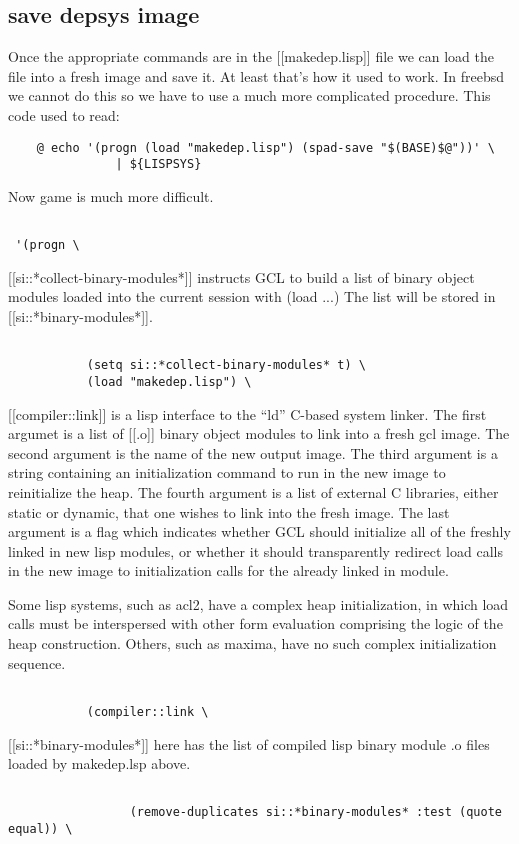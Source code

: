 \documentclass{article}
\begin{document}
\subsection{save depsys image}

Once the appropriate commands are in the [[makedep.lisp]] file
we can load the file into a fresh image and save it. At least that's
how it used to work. In freebsd we cannot do this so we have to use
a much more complicated procedure.
This code used to read:
\begin{verbatim}
	@ echo '(progn (load "makedep.lisp") (spad-save "$(BASE)$@"))' \
               | ${LISPSYS}
\end{verbatim}

Now game is much more difficult.
\begin{verbatim}

 '(progn \

\end{verbatim}

[[si::*collect-binary-modules*]] instructs GCL to build a list of
binary object modules loaded into the current session with (load ...)
The list will be stored in [[si::*binary-modules*]].
\begin{verbatim}

	       (setq si::*collect-binary-modules* t) \
	       (load "makedep.lisp") \

\end{verbatim}

[[compiler::link]] is a lisp interface to the ``ld'' C-based system linker.
The first argumet is a list of [[.o]] binary object modules to link into a
fresh gcl image. The second argument is the name of the new output
image.  The third argument is a string containing an initialization
command to run in the new image to reinitialize the heap.  The fourth
argument is a list of external C libraries, either static or dynamic,
that one wishes to link into the fresh image.  The last argument is a
flag which indicates whether GCL should initialize all of the freshly
linked in new lisp modules, or whether it should transparently
redirect load calls in the new image to initialization calls for the
already linked in module.

Some lisp systems, such as acl2, have a complex heap initialization,
in which load calls must be interspersed with other form evaluation
comprising the logic of the heap construction.  Others, such as
maxima, have no such complex initialization sequence.
\begin{verbatim}

	       (compiler::link \

\end{verbatim}
[[si::*binary-modules*]] here has the list of compiled lisp binary module
.o files loaded by makedep.lsp above.
\begin{verbatim}

				 (remove-duplicates si::*binary-modules* :test (quote equal)) \

\end{verbatim}
\end{document}

